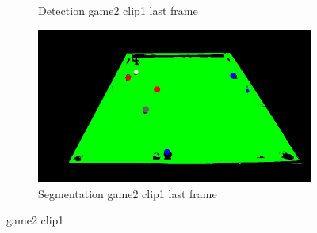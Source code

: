 \begin{figure}[H]
\begin{subfigure}[b]{0.35\textwidth}
        \caption{Detection game2 clip1 last frame}
        \label{fig: game2_clip1_last_frame_detected}
    \end{subfigure}
    \begin{subfigure}[b]{0.35\textwidth}
        \centering
        \includegraphics[width=\textwidth]{images/Segmentation/game2_clip1_segmented_balls_last_frame.jpg}
        \caption{Segmentation game2 clip1 last frame}
		\label{fig: game2_clip1_last_frame_segmented}
    \end{subfigure}
	\caption{game2 clip1}
\end{figure}


